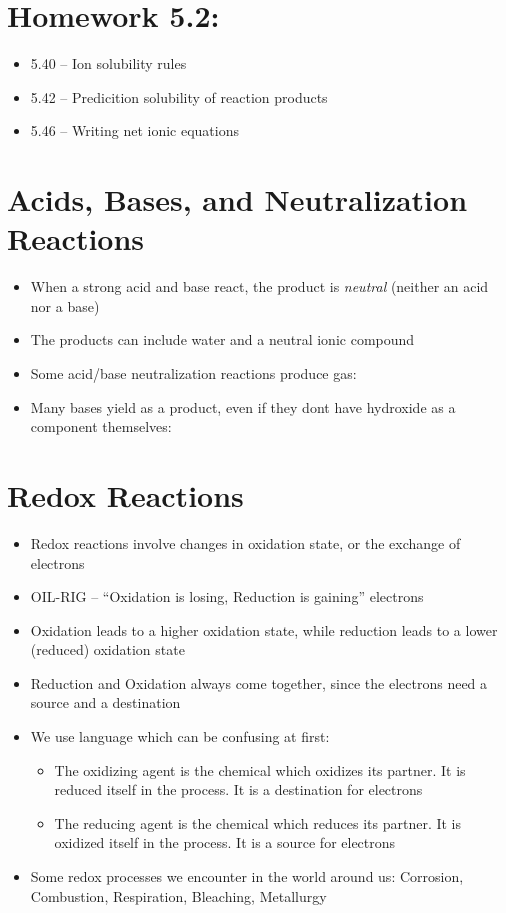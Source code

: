 \documentclass[12pt, openany, letterpaper]{memoir}
\begin{document}
\section*{Homework 5.2:}
\begin{itemize}
  \item 5.40 -- Ion solubility rules
  \item 5.42 -- Predicition solubility of reaction products
  \item 5.46 -- Writing net ionic equations
\end{itemize}

\section{Acids, Bases, and Neutralization Reactions}
\begin{itemize}
	\item When a strong acid and base react, the product is \emph{neutral} (neither an acid nor a base)
	\item The products can include water and a neutral ionic compound
	\item Some acid/base neutralization reactions produce gas: 
	\item Many bases yield  as a product, even if they dont have hydroxide as a component themselves: 
\end{itemize}

\section{Redox Reactions}
\begin{itemize}
	\item Redox reactions involve changes in oxidation state, or the exchange of electrons
	\item OIL-RIG -- ``Oxidation is losing, Reduction is gaining'' electrons
	\item Oxidation leads to a higher oxidation state, while reduction leads to a lower (reduced) oxidation state
	\item Reduction and Oxidation always come together, since the electrons need a source and a destination
	\item We use language which can be confusing at first:
	      \begin{itemize}
		      \item The oxidizing agent is the chemical which oxidizes its partner. It is reduced itself in the process. It is a destination for electrons
		      \item The reducing agent is the chemical which reduces its partner. It is oxidized itself in the process. It is a source for electrons
	      \end{itemize}
	\item Some redox processes we encounter in the world around us: Corrosion, Combustion, Respiration, Bleaching, Metallurgy
\end{itemize}
\end{document}
